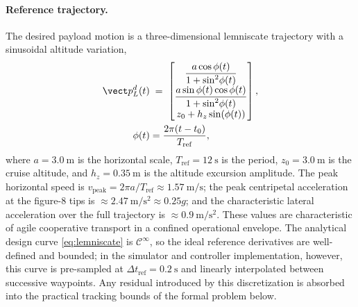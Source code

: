 \paragraph{Reference trajectory.} The desired payload motion is a three-dimensional lemniscate trajectory with a sinusoidal altitude variation,
\begin{align}
  \label{eq:lemniscate}
  \vect p_L^d(t) &\;=\;
    \begin{bmatrix}
      \dfrac{a\cos\phi(t)}{1 + \sin^2\!\phi(t)} \\[6pt]
      \dfrac{a\sin\phi(t)\cos\phi(t)}{1 + \sin^2\!\phi(t)} \\[6pt]
 z_0 + h_z\sin(\phi(t))
    \end{bmatrix},\\
  \phi(t) &= \frac{2\pi(t - t_0)}{T_{\mathrm{ref}}},\nonumber
\end{align}
where $a = \SI{3.0}{\metre}$ is the horizontal scale, $T_{\mathrm{ref}} = \SI{12}{\second}$ is the period, $z_0 = \SI{3.0}{\metre}$ is the cruise altitude, and $h_z = \SI{0.35}{\metre}$ is the altitude excursion amplitude.
The peak horizontal speed is $v_{\mathrm{peak}} = 2\pi a / T_{\mathrm{ref}} \approx \SI{1.57}{\metre\per\second}$; the peak centripetal acceleration at the figure-8 tips is $\approx \SI{2.47}{\metre\per\second\squared} \approx 0.25g$; and the characteristic lateral acceleration over the full trajectory is $\approx \SI{0.9}{\metre\per\second\squared}$. These values are characteristic of agile cooperative transport in a confined operational envelope. The analytical design curve \eqref{eq:lemniscate} is $\mathcal{C}^\infty$, so the ideal reference derivatives are well-defined and bounded; in the simulator and controller implementation, however, this curve is pre-sampled at $\Delta t_{\mathrm{ref}} = \SI{0.2}{\second}$ and linearly interpolated between successive waypoints. Any residual introduced by this discretization is absorbed into the practical tracking bounds of the formal problem below.

